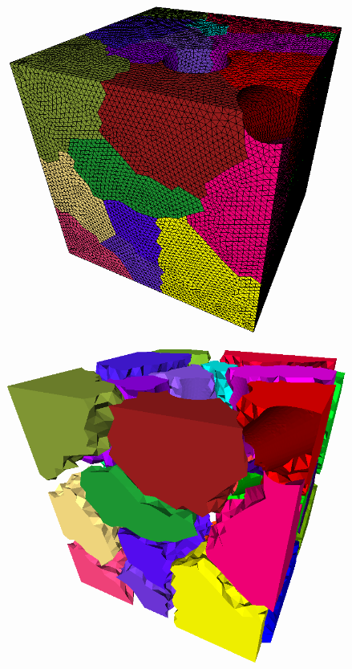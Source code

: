 \documentclass[compress,12pt]{beamer}
\begin{document}
\begin{frame}
    {
      \begin{minipage}[h]{.45\textwidth}
	\begin{figure}[h]
	  \centering
            \includegraphics[width=\textwidth]{figures/part_trans}
	\end{figure}
      \end{minipage}
      \begin{minipage}[h]{.45\textwidth}
	\begin{figure}[h]
	  \centering
            \includegraphics[width=\textwidth]{figures/part_exp_trans}
	\end{figure}
      \end{minipage}
    }
\end{frame}
\end{document}
